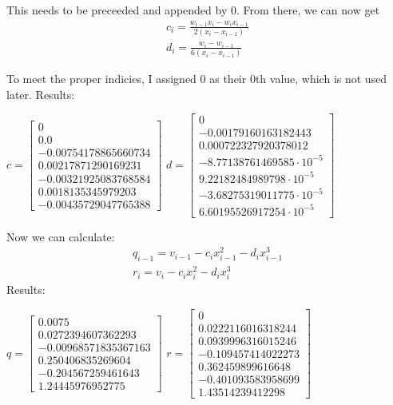 \documentclass{article}
\begin{document}
This needs to be preceeded and appended by 0. From there, we can now get
\[\begin{array}{l}
        {c_i} = \frac{{{w_{i - 1}}{x_i} - {w_i}{x_{i - 1}}}}{{2\left( {{x_i} - {x_{i - 1}}} \right)}} \\
        {d_i} = \frac{{{w_i} - {w_{i - 1}}}}{{6\left( {{x_i} - {x_{i - 1}}} \right)}}
    \end{array}\]

To meet the proper indicies, I assigned 0 as their 0th value, which is not used later. Results:

$c = \displaystyle \left[\begin{matrix}0\\0.0\\-0.00754178865660734\\0.00217871290169231\\-0.00321925083768584\\0.0018135345979203\\-0.00435729047765388\end{matrix}\right]$
$d = \displaystyle \left[\begin{matrix}0\\-0.00179160163182443\\0.000722327920378012\\-8.77138761469585 \cdot 10^{-5}\\9.22182484989798 \cdot 10^{-5}\\-3.68275319011775 \cdot 10^{-5}\\6.60195526917254 \cdot 10^{-5}\end{matrix}\right]$

Now we can calculate:
\[\begin{array}{l}
        {q_{i - 1}} = {v_{i - 1}} - {c_i}x_{i - 1}^2 - {d_i}x_{i - 1}^3 \\
        {r_i} = {v_i} - {c_i}x_i^2 - {d_i}x_i^3
    \end{array}\]
Results:

$q =\displaystyle \left[\begin{matrix}0.0075\\0.0272394607362293\\-0.00968571835367163\\0.250406835269604\\-0.204567259461643\\1.24445976952775\end{matrix}\right]$
$r = \displaystyle \left[\begin{matrix}0\\0.0222116016318244\\0.0939996316015246\\-0.109457414022273\\0.362459899616648\\-0.401093583958699\\1.43514239412298\end{matrix}\right]$
\end{document}
